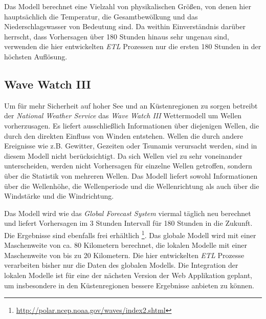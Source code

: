Das Modell berechnet eine Vielzahl von physikalischen Größen, von
denen hier hauptsächlich die Temperatur, die Gesamtbewölkung und das
Niederschlagswasser von Bedeutung sind. Da weithin Einverständnis
darüber herrscht, dass Vorhersagen über 180 Stunden hinaus sehr
ungenau sind, verwenden die hier entwickelten \textit{ETL} Prozessen
nur die ersten 180 Stunden in der höchsten Auflösung.

\subsection{Wave Watch III}

Um für mehr Sicherheit auf hoher See und an Küstenregionen zu sorgen
betreibt der \textit{National Weather Service} das \textit{Wave Watch
  III} Wettermodell um Wellen vorherzusagen. Es liefert ausschließlich
Informationen über diejenigen Wellen, die durch den direkten Einfluss
von Winden entstehen. Wellen die durch andere Ereignisse wie
z.B. Gewitter, Gezeiten oder Tsunamis verursacht werden, sind in
diesem Modell nicht berücksichtigt. Da sich Wellen viel zu sehr
voneinander unterscheiden, werden nicht Vorhersagen für einzelne
Wellen getroffen, sondern über die Statistik von mehreren Wellen. Das
Modell liefert sowohl Informationen über die Wellenhöhe, die
Wellenperiode und die Wellenrichtung als auch über die Windstärke und
die Windrichtung.

Das Modell wird wie das \textit{Global Forecast System} viermal
täglich neu berechnet und liefert Vorhersagen im 3 Stunden Intervall
für 180 Stunden in die Zukunft. Die Ergebnisse sind ebenfalls frei
erhältlich
\footnote{\url{http://polar.ncep.noaa.gov/waves/index2.shtml}}. Das
globale Modell wird mit einer Maschenweite von ca. 80 Kilometern
berechnet, die lokalen Modelle mit einer Maschenweite von bis zu 20
Kilometern. Die hier entwickelten \textit{ETL} Prozesse verarbeiten
bisher nur die Daten des globalen Modells. Die Integration der lokalen
Modelle ist für eine der nächsten Version der Web Applikation geplant,
um insbesondere in den Küstenregionen bessere Ergebnisse anbieten zu
können.

